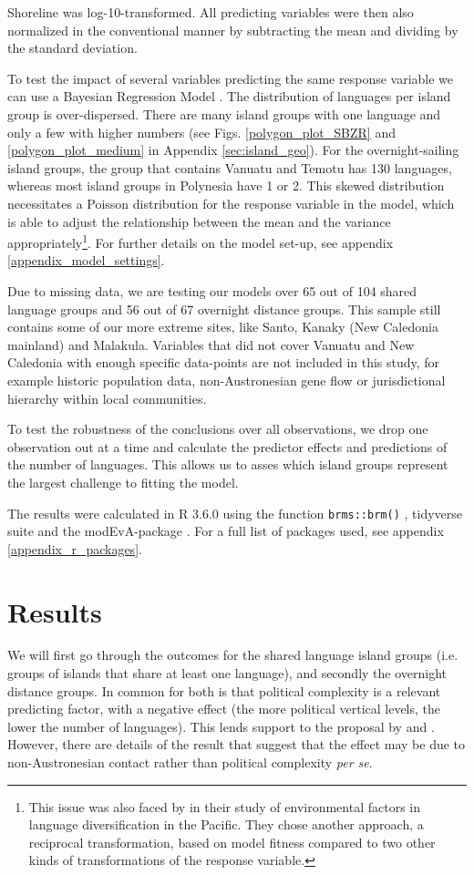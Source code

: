 \documentclass[unnumsec,webpdf,modern,medium]{oup-authoring-template}
\begin{document}
Shoreline was log-10-transformed. All predicting variables were then also normalized in the conventional manner by subtracting the mean and dividing by the standard deviation.

To test the impact of several variables predicting the same response variable we can use a Bayesian Regression Model \citep{gelman2006data, burkner2017brms}. The distribution of languages per island group is over-dispersed. There are many island groups with one language and only a few with higher numbers (see Figs. \ref{polygon_plot_SBZR} and \ref{polygon_plot_medium} in Appendix \ref{sec:island_geo}). For the overnight-sailing island groups, the group that contains Vanuatu and Temotu has 130 languages, whereas most island groups in Polynesia have 1 or 2. This skewed distribution necessitates a Poisson distribution for the response variable in the model, which is able to adjust the relationship between the mean and the variance appropriately\footnote{This issue was also faced by \citet{gavin2012island} in their study of environmental factors in language diversification in the Pacific. They chose another approach, a reciprocal transformation, based on model fitness compared to two other kinds of transformations of the response variable.}. For further details on the model set-up, see appendix \ref{appendix_model_settings}.

Due to missing data, we are testing our models over 65 out of 104 shared language groups and 56 out of 67 overnight distance groups. This sample still contains some of our more extreme sites, like Santo, Kanaky (New Caledonia mainland) and Malakula. Variables that did not cover Vanuatu and New Caledonia with enough specific data-points are not included in this study, for example historic population data, non-Austronesian gene flow or jurisdictional hierarchy within local communities. 

To test the robustness of the conclusions over all observations, we drop one observation out at a time and calculate the predictor effects and predictions of the number of languages. This allows us to asses which island groups represent the largest challenge to fitting the model. 

The results were calculated in R 3.6.0 \citep{R} using the function \texttt{brms::brm()} \citep{burkner2017brms}, tidyverse suite \citep{tidyverse13} and the modEvA-package \citep{barbosa2016package}. For a full list of packages used, see appendix \ref{appendix_r_packages}.

\FloatBarrier
\section{Results}
We will first go through the outcomes for the shared language island groups (i.e. groups of islands that share at least one language), and secondly the overnight distance groups. In common for both is that political complexity is a relevant predicting factor, with a negative effect (the more political vertical levels, the lower the number of languages). This lends support to the proposal by \citet{pawley81} and \citet{pawley2007}. However, there are details of the result that suggest that the effect may be due to non-Austronesian contact rather than political complexity \emph{per se}.
\end{document}
